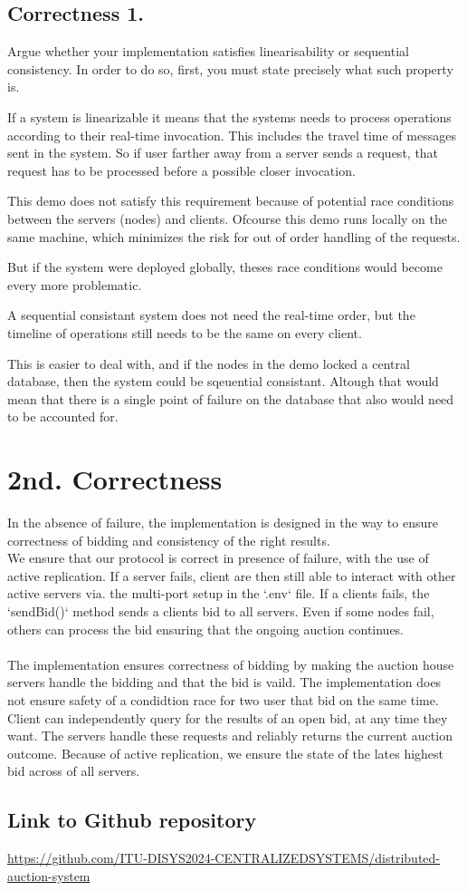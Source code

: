 \documentclass[a4paper,11pt]{article}
\begin{document}
\subsection{Correctness 1.}
Argue whether your implementation satisfies linearisability or sequential consistency. In order to do so, first, you must state precisely what such property is.


If a system is linearizable it means that the systems needs to process operations according to their real-time invocation.
This includes the travel time of messages sent in the system. So if user farther away from a server sends a request,
that request has to be processed before a possible closer invocation.

This demo does not satisfy this requirement because of potential race conditions between the servers (nodes) and clients.
Ofcourse this demo runs locally on the same machine, which minimizes the risk for out of order handling of the requests.

But if the system were deployed globally, theses race conditions would become every more problematic.


A sequential consistant system does not need the real-time order, but the timeline of operations still needs to be the same on every client.

This is easier to deal with, and if the nodes in the demo locked a central database, then the system could be sqeuential consistant.
Altough that would mean that there is a single point of failure on the database that also would need to be accounted for.

\section{2nd. Correctness}
In the absence of failure, the implementation is designed in the way to ensure correctness of bidding and consistency of the right results.
\\
We ensure that our protocol is correct in presence of failure, with the use of active replication. 
If a server fails, client are then still able to interact with other active servers via. the multi-port setup in the `.env` file.
If a clients fails, the `sendBid()` method sends a clients bid to all servers. Even if some nodes fail, others can process the bid ensuring that the ongoing auction continues.
\\
\\
The implementation ensures correctness of bidding by making the auction house servers handle the bidding and that the bid is vaild. The implementation does not ensure safety of a condidtion race for two user that bid on the same time.
\\
Client can independently query for the results of an open bid, at any time they want. The servers handle these requests and reliably returns the current auction outcome. Because of active replication, we ensure the state of the lates highest bid across of all servers.  
\\

\subsection*{Link to Github repository}

\href{https://github.com/ITU-DISYS2024-CENTRALIZEDSYSTEMS/distributed-auction-system}{https://github.com/ITU-DISYS2024-CENTRALIZEDSYSTEMS/distributed-auction-system}
\end{document}
